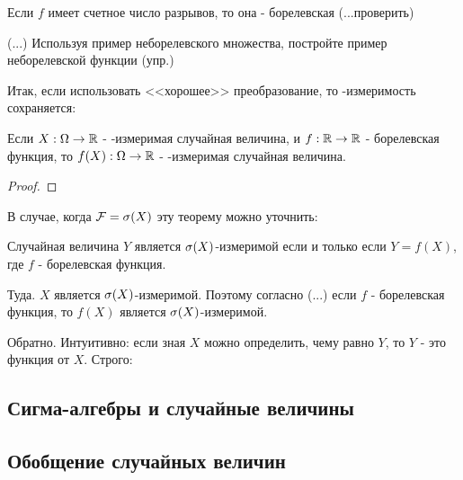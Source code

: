 {\begin{myth} Если $f$ имеет счетное число разрывов, то она - борелевская (...проверить)
\end{myth}
(...) Используя пример неборелевского множества, постройте пример неборелевской функции (упр.)

Итак, если использовать <<хорошее>> преобразование, то \F-измеримость сохраняется:

\begin{myth} Если $X:\Omega\rightarrow\mathbb R$ - \F-измеримая случайная величина, и $f:\mathbb R\rightarrow\mathbb R$ - борелевская функция, то $f(X):\Omega\rightarrow\mathbb R$ - \F-измеримая случайная величина.
\end{myth}
\begin{proof}
\end{proof}
В случае, когда $\mathcal{F}=\sigma(X)$ эту теорему можно уточнить:

\begin{myth} Случайная величина $Y$ является $\sigma(X)$-измеримой если и только если $Y=f(X)$, где $f$ - борелевская функция.
\end{myth}
Туда. $X$ является $\sigma(X)$-измеримой. Поэтому согласно (...) если $f$ - борелевская функция, то $f(X)$ является $\sigma(X)$-измеримой.

Обратно.  Интуитивно: если зная $X$ можно определить, чему равно $Y$, то $Y$ - это функция от $X$. Строго:



}\subsection{Сигма-алгебры и случайные величины} \subsection{Обобщение случайных величин} \problemtext{

}
